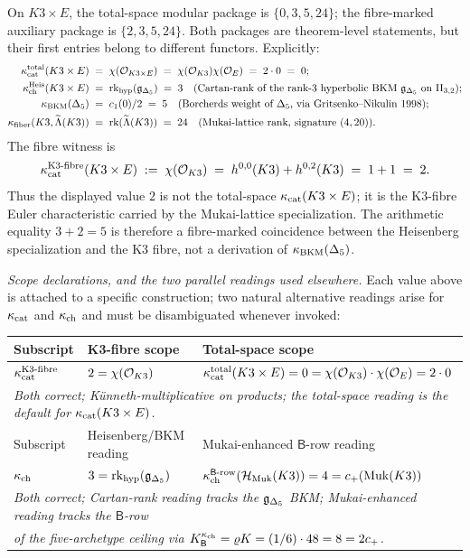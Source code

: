 \begin{theorem}
\label{wn:thm:spine-four-values}
On $K3 \times E$, the total-space modular package is
$\{0, 3, 5, 24\}$; the fibre-marked auxiliary package is
$\{2, 3, 5, 24\}$.  Both packages are theorem-level statements, but
their first entries belong to different functors.  Explicitly:
\begin{align*}
\kappa_{\mathrm{cat}}^{\mathrm{total}}(K3 \times E)
&\;=\; \chi(\mathcal{O}_{K3\times E})
\;=\; \chi(\mathcal{O}_{K3})\chi(\mathcal{O}_E)
\;=\; 2\cdot 0 \;=\; 0;\\
\kappa_{\mathrm{ch}}^{\mathrm{Heis}}(K3 \times E)
&\;=\; \mathrm{rk}_{\mathrm{hyp}}(\mathfrak{g}_{\Delta_5})
\;=\; 3
\quad\text{(Cartan-rank of the rank-$3$ hyperbolic BKM $\mathfrak{g}_{\Delta_5}$ on
$\mathrm{II}_{3,2}$)};\\
\kappa_{\mathrm{BKM}}(\Delta_5) &\;=\; c_1(0)/2 \;=\; 5
\quad\text{(Borcherds weight of $\Delta_5$, via Gritsenko--Nikulin
$1998$)};\\
\kappa_{\mathrm{fiber}}(K3, \widetilde{\Lambda}(K3)) &\;=\; \mathrm{rk}(\widetilde{\Lambda}(K3)) \;=\; 24
\quad\text{(Mukai-lattice rank, signature $(4, 20)$)}.
\end{align*}
The fibre witness is
\[
\kappa_{\mathrm{cat}}^{\mathrm{K3\text{-}fibre}}(K3 \times E)
\;:=\; \chi(\mathcal{O}_{K3})
\;=\; h^{0,0}(K3)+h^{0,2}(K3)
\;=\; 1+1
\;=\; 2.
\]
Thus the displayed value $2$ is not the total-space
$\kappa_{\mathrm{cat}}(K3\times E)$; it is the K3-fibre Euler characteristic carried by
the Mukai-lattice specialization.  The arithmetic equality
$3+2=5$ is therefore a fibre-marked coincidence between the
Heisenberg specialization and the K3 fibre, not a derivation of
$\kappa_{\mathrm{BKM}}(\Delta_5)$.

\emph{Scope declarations, and the two parallel readings used elsewhere.}
Each value above is attached to a specific construction; two natural
alternative readings arise for $\kappa_{\mathrm{cat}}$ and $\kappa_{\mathrm{ch}}$ and must be
disambiguated whenever invoked:

\begin{center}
\begin{tabular}{lll}
\toprule
Subscript & K3-fibre scope & Total-space scope \\
\midrule
$\kappa_{\mathrm{cat}}^{\mathrm{K3\text{-}fibre}}$ & $2 = \chi(\mathcal{O}_{K3})$ &
$\kappa_{\mathrm{cat}}^{\mathrm{total}}(K3\times E) = 0 = \chi(\mathcal{O}_{K3})\cdot\chi(\mathcal{O}_E) = 2\cdot 0$ \\
\multicolumn{3}{l}{\emph{Both correct; K\"unneth-multiplicative
on products; the total-space reading is the default for $\kappa_{\mathrm{cat}}(K3\times E)$.}} \\
\midrule
Subscript & Heisenberg/BKM reading & Mukai-enhanced $\mathsf{B}$-row reading \\
\midrule
$\kappa_{\mathrm{ch}}$ & $3 = \mathrm{rk}_{\mathrm{hyp}}(\mathfrak{g}_{\Delta_5})$ &
$\kappa_{\mathrm{ch}}^{\mathsf{B}\text{-row}}(\mathcal{H}_{\mathrm{Muk}}(K3)) = 4 = c_+(\mathrm{Muk}(K3))$ \\
\multicolumn{3}{l}{\emph{Both correct; Cartan-rank reading tracks the
$\mathfrak{g}_{\Delta_5}$ BKM; Mukai-enhanced reading tracks the $\mathsf{B}$-row}} \\
\multicolumn{3}{l}{\emph{of the five-archetype ceiling via
$K^{\kappa_{\mathrm{ch}}}_{\mathsf{B}} = \varrho K = (1/6)\cdot 48 = 8 = 2c_+$.}} \\
\bottomrule
\end{tabular}
\end{center}


\end{theorem}
